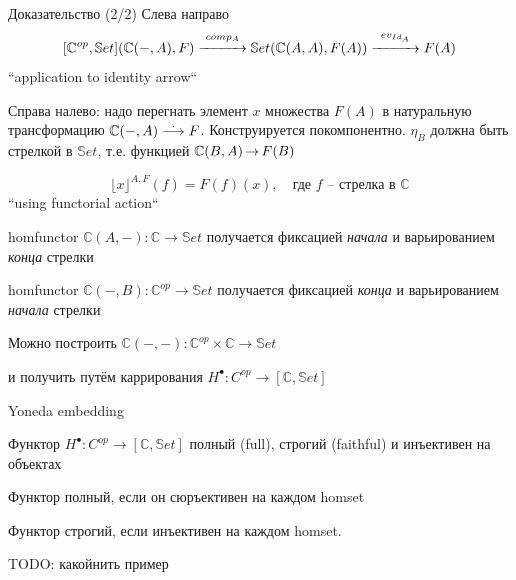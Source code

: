 \documentclass[
  russian,
  aspectratio=169,
  xcolor={svgnames},
  hyperref={colorlinks,citecolor=DeepPink4}]{beamer}
\newcommand*{\natarr}{\ensuremath{\overset{\text{\normalsize .}}\longrightarrow}}
\begin{document}
\begin{frame}[fragile]{Доказательство (2/2)}
Слева направо
$$
[\mathbb{C}^{op}, \mathbb{S}et](\mathbb{C}(-,A), F)
  \overset{comp_A}{\xrightarrow{\hspace*{1cm}}}
\mathbb{S}et(\mathbb{C}(A,A), F(A))
  \overset{ev_{Id_A}}{\xrightarrow{\hspace*{1cm}}}
  F(A)
$$
``application to identity arrow``\\ \vspace{1cm}

Справа налево: надо перегнать элемент $x$ множества $F(A)$ в
натуральную трансформацию $\mathbb{C}(-,A)\natarr F$. Конструируется покомпонентно.
$\eta_B$ должна быть стрелкой в $\mathbb{S}et$, т.е. функцией $\mathbb{C}(B,A) \operatorname{\rightarrow} F(B)$

$$
\lfloor x\rfloor^{A, F}(f) = F(f)(x),\quad \text{где $f$  -- стрелка в~}\mathbb{C}
$$
``using functorial action``
\end{frame}

\begin{frame}[fragile]
homfunctor $\mathbb{C}(A,-): \mathbb{C} \rightarrow\mathbb{S}et$
получается фиксацией \emph{начала} и варьированием \emph{конца} стрелки
\vspace{0.5cm}

homfunctor $\mathbb{C}(-,B): \mathbb{C}^{op}\rightarrow\mathbb{S}et$
получается фиксацией \emph{конца} и варьированием \emph{начала} стрелки
\vspace{0.5cm}

Можно построить $\mathbb{C}(-,-): \mathbb{C}^{op}\times \mathbb{C} \rightarrow\mathbb{S}et$

и получить путём каррирования
$H^{\bullet}: C^{op}\rightarrow [\mathbb{C}, \mathbb{S}et]$

\end{frame}

\begin{frame}[fragile]{Yoneda embedding}
\begin{lemma}%
Функтор
$H^{\bullet}: C^{op}\rightarrow [\mathbb{C}, \mathbb{S}et]$
полный (full), строгий (faithful) и инъективен на объектах
\end{lemma}\vspace{1cm}

Функтор полный, если он сюръективен на каждом homset

Функтор строгий, если инъективен на каждом homset.\vspace{1cm}


TODO: какойнить пример
\end{frame}
\end{document}
